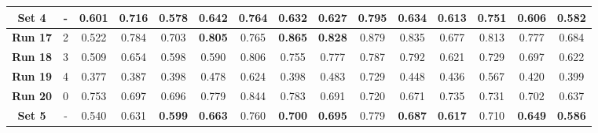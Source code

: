\begin{table}[!ht]
{\begin{tabular}{|c|c|ccc|ccc|ccc|c|c|c|c|}
		\hline
		
		\textbf{Set 4} & - & \multicolumn{1}{c|}{\textbf{0.601}} & \multicolumn{1}{c|}{\textbf{0.716}} & 0.578 & \multicolumn{1}{c|}{0.642} & \multicolumn{1}{c|}{\textbf{0.764}} & 0.632 & \multicolumn{1}{c|}{0.627} & \multicolumn{1}{c|}{\textbf{0.795}} & 0.634 & 0.613 & \textbf{0.751} & 0.606 & 0.582 \\
		
		\hline
		\hline
		
		\textbf{Run 17} & 2 & \multicolumn{1}{c|}{0.522} & \multicolumn{1}{c|}{0.784} & 0.703 & \multicolumn{1}{c|}{\textbf{0.805}} & \multicolumn{1}{c|}{0.765} & \textbf{0.865} & \multicolumn{1}{c|}{\textbf{0.828}} & \multicolumn{1}{c|}{0.879} & 0.835 & 0.677 & 0.813 & 0.777 & 0.684 \\
	
		\textbf{Run 18} & 3 & \multicolumn{1}{c|}{0.509} & \multicolumn{1}{c|}{0.654} & 0.598 & \multicolumn{1}{c|}{0.590} & \multicolumn{1}{c|}{0.806} & 0.755 & \multicolumn{1}{c|}{0.777} & \multicolumn{1}{c|}{0.787} & 0.792 & 0.621 & 0.729 & 0.697 & 0.622 \\
					
		\textbf{Run 19} & 4 & \multicolumn{1}{c|}{0.377} & \multicolumn{1}{c|}{0.387} & 0.398 & \multicolumn{1}{c|}{0.478} & \multicolumn{1}{c|}{0.624} & 0.398 & \multicolumn{1}{c|}{0.483} & \multicolumn{1}{c|}{0.729} & 0.448 & 0.436 & 0.567 & 0.420 & 0.399 \\
		
		\textbf{Run 20} & 0 & \multicolumn{1}{c|}{0.753} & \multicolumn{1}{c|}{0.697} & 0.696 & \multicolumn{1}{c|}{0.779} & \multicolumn{1}{c|}{0.844} & 0.783 & \multicolumn{1}{c|}{0.691} & \multicolumn{1}{c|}{0.720} & 0.671 & 0.735 & 0.731 & 0.702 & 0.637 \\
		
		\hline
		
		\textbf{Set 5} & - & \multicolumn{1}{c|}{0.540} & \multicolumn{1}{c|}{0.631} & \textbf{0.599} & \multicolumn{1}{c|}{\textbf{0.663}} & \multicolumn{1}{c|}{0.760} & \textbf{0.700} & \multicolumn{1}{c|}{\textbf{0.695}} & \multicolumn{1}{c|}{0.779} & \textbf{0.687} & \textbf{0.617} & 0.710 & \textbf{0.649} & \textbf{0.586} \\
		
		\hline
			
	\end{tabular}}
	\label{tab:Experiment1.3FourPatches}
\end{table}

